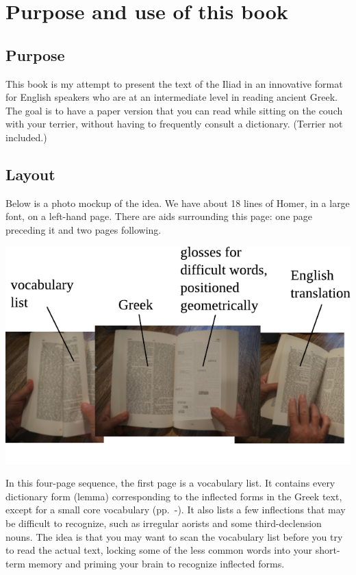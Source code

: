 \chapter*{Purpose and use of this book}

{\small

\section*{Purpose}

This book is my attempt to present the text of the Iliad in an innovative format
for English speakers who are at an intermediate level in reading ancient Greek.
The goal is to have a paper version that you can read while sitting on the couch
with your terrier, without having to frequently consult a dictionary. (Terrier
not included.)

\section*{Layout}

Below is a photo mockup of the
idea. We have about 18 lines of Homer, in a large font, on a left-hand
page. There are aids surrounding this page: one page preceding it and
two pages following.

\includegraphics{iliad/figs/manual}

In this four-page sequence, the first page is a vocabulary list. It
contains every dictionary form (lemma) corresponding to the inflected
forms in the Greek text, except for a small core vocabulary (pp.~\pageref{core-vocab}-\pageref{core-vocab-end}).
It also lists a few inflections that may be difficult to recognize, such as irregular
aorists and some third-declension nouns.
The idea is that you may want to scan the vocabulary
list before you try to read the actual text, locking some of the less
common words into your short-term memory and priming your brain to
recognize inflected forms.

}
